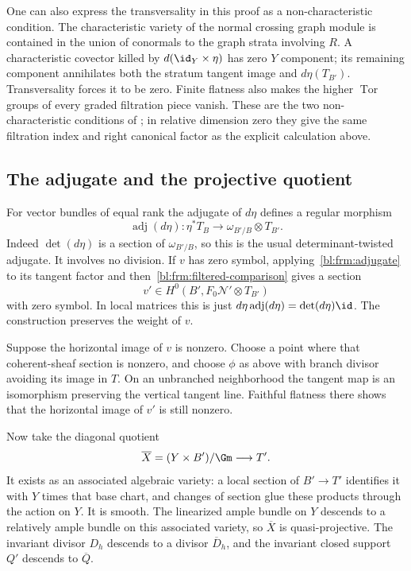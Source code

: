 One can also express the transversality in this proof as a
non-characteristic condition. The characteristic variety of the
normal crossing graph module is contained in the union of
conormals to the graph strata involving $R$. A characteristic
covector killed by $d(\id_Y\times\eta)$ has zero $Y$ component;
its remaining component annihilates both the stratum tangent
image and $d\eta(T_{B'})$. Transversality forces it to be zero.
Finite flatness also makes the higher $\operatorname{Tor}$ groups of
every graded filtration piece vanish. These are the two
non-characteristic conditions of
\cite[Section~3.5.1 and Lemmas~3.5.3, 3.5.5]{Saito1988}; in relative dimension
zero they give the same filtration index and right canonical factor
as the explicit calculation above.

\subsection{The adjugate and the projective quotient}

For vector bundles of equal rank the adjugate of $d\eta$ defines
a regular morphism
\begin{equation}\label{bl:frm:adjugate}
 \operatorname{adj}(d\eta):
 \eta^*T_B\longrightarrow\omega_{B'/B}\otimes T_{B'}.
\end{equation}
Indeed $\det(d\eta)$ is a section of $\omega_{B'/B}$, so this
is the usual determinant-twisted adjugate. It involves no division.
If $v$ has zero symbol, applying~\eqref{bl:frm:adjugate} to its tangent
factor and then~\eqref{bl:frm:filtered-comparison} gives a section
\begin{equation}\label{bl:frm:transported-symbol}
 v'\in H^0(B',F_0\mathcal N'\otimes T_{B'})
\end{equation}
with zero symbol. In local matrices this is just
$d\eta\operatorname{adj}(d\eta)=\det(d\eta)\id$.
The construction preserves the weight of $v$.

Suppose the horizontal image of $v$ is nonzero. Choose a point
where that coherent-sheaf section is nonzero, and choose $\phi$
as above with branch divisor avoiding its image in $T$.
On an unbranched neighborhood the tangent map is an isomorphism
preserving the vertical tangent line. Faithful flatness there
shows that the horizontal image of $v'$ is still nonzero.

Now take the diagonal quotient
\[
 \overline X=(Y\times B')/\Gm\longrightarrow T'.
\]
It exists as an associated algebraic variety: a local section of
$B'\to T'$ identifies it with $Y$ times that base chart, and changes
of section glue these products through the action on $Y$.
It is smooth. The linearized ample bundle on $Y$ descends to a
relatively ample bundle on this associated variety, so
$\overline X$ is quasi-projective. The invariant divisor $D_h$
descends to a divisor $\overline D_h$, and the invariant closed
support $Q'$ descends to $\overline Q$.

